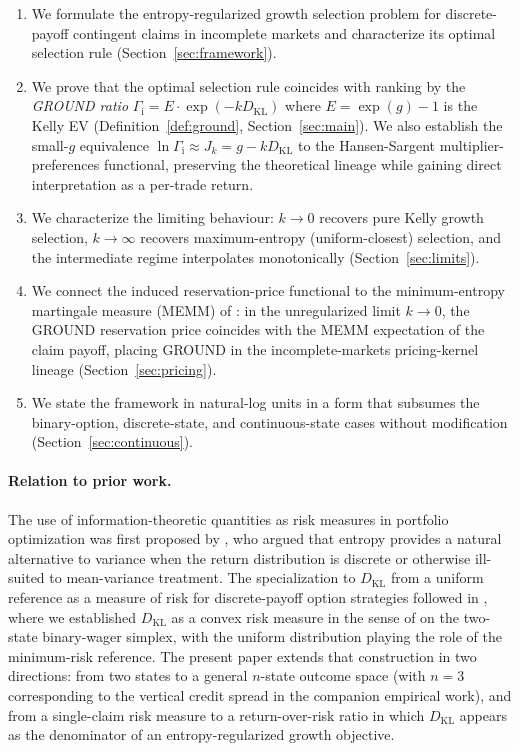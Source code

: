 \documentclass[11pt]{article}
\theoremstyle{definition}
\theoremstyle{remark}
\newcommand{\KL}{D_{\mathrm{KL}}}
\newcommand{\GROUND}{\Gamma_{\mathrm{i}}}
\begin{document}
\begin{enumerate}
    \item We formulate the entropy-regularized growth selection problem
          for discrete-payoff contingent claims in incomplete markets
          and characterize its optimal selection rule
          (Section~\ref{sec:framework}).
    \item We prove that the optimal selection rule coincides with
          ranking by the \emph{GROUND ratio} $\GROUND = E \cdot \exp(-k \KL)$
          where $E = \exp(g) - 1$ is the Kelly EV (Definition~\ref{def:ground},
          Section~\ref{sec:main}). We also establish the small-$g$
          equivalence $\ln \GROUND \approx J_k = g - k\KL$ to the
          Hansen-Sargent multiplier-preferences functional, preserving
          the theoretical lineage while gaining direct interpretation
          as a per-trade return.
    \item We characterize the limiting behaviour: $k \to 0$ recovers
          pure Kelly growth selection, $k \to \infty$ recovers
          maximum-entropy (uniform-closest) selection, and the
          intermediate regime interpolates monotonically
          (Section~\ref{sec:limits}).
    \item We connect the induced reservation-price functional to the
          minimum-entropy martingale measure (MEMM) of
          \citet{frittelli2000}: in the unregularized limit $k \to 0$,
          the GROUND reservation price coincides with the MEMM
          expectation of the claim payoff, placing GROUND in the
          incomplete-markets pricing-kernel lineage
          (Section~\ref{sec:pricing}).
    \item We state the framework in natural-log units in a form that
          subsumes the binary-option, discrete-state, and
          continuous-state cases without modification
          (Section~\ref{sec:continuous}).
\end{enumerate}

\paragraph{Relation to prior work.}
The use of information-theoretic quantities as risk measures in
portfolio optimization was first proposed by
\citet{mercurio2020portfolio}, who argued that entropy provides a
natural alternative to variance when the return distribution is
discrete or otherwise ill-suited to mean-variance treatment. The
specialization to $\KL$ from a uniform reference as a measure of risk
for discrete-payoff option strategies followed in
\citet{mercurio2020binary}, where we established $\KL$ as a convex
risk measure in the sense of \citet{follmer2002} on the two-state
binary-wager simplex, with the uniform distribution playing the role
of the minimum-risk reference. The present paper
extends that construction in two directions: from two states to a
general $n$-state outcome space (with $n = 3$ corresponding to the
vertical credit spread in the companion empirical work), and from a
single-claim risk measure to a return-over-risk ratio in which $\KL$
appears as the denominator of an entropy-regularized growth
objective.
\end{document}
